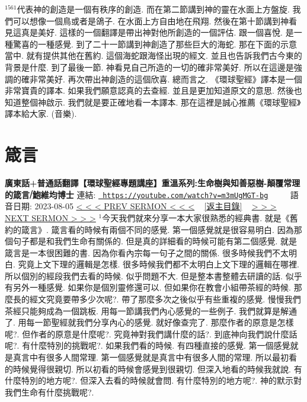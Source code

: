 \documentclass{book}
\begin{document}
$^{1561}$代表神的創造是一個有秩序的創造.
而在第二節講到神的靈在水面上方盤旋.
我們可以想像一個鳥或者是鴿子.
在水面上方自由地在飛翔.
然後在第十節講到神看見這真是美好.
這樣的一個翻譯是帶出神對他所創造的一個評估.
跟一個喜悅.
是一種驚喜的一種感覺.
到了二十一節講到神創造了那些巨大的海蛇.
那在下面的示意當中.
就有提供其他在舊約.
這個海蛇跟海怪出現的經文.
並且也告訴我們古今東的背景是什麼.
到了最後一節.
神看見自己所造的一切的確非常美好.
所以在這邊是強調的確非常美好.
再次帶出神創造的這個欣喜.
總而言之.
《環球聖經》譯本是一個非常寶貴的譯本.
如果我們願意認真的去查經.
並且是更加知道原文的意思.
然後也知道整個神啟示.
我們就是要正確地看一本譯本.
那在這裡是誠心推薦《環球聖經》譯本給大家.
(音樂).
\newpage



\section{箴言}
\label{sec:m3mUgMGT_bg}
\textbf{廣東話+普通話翻譯【環球聖經專題講座】重溫系列:生命樹與知善惡樹-顛覆常理的箴言⧸鮑維均博士}
\newline
\newline
連結: \href{https://youtube.com/watch?v=m3mUgMGT-bg}{\texttt{ https://youtube.com/watch?v=m3mUgMGT-bg}} ~~~~ 語音日期: 2023-08-05 
\newline
\newline
\hyperref[sec:0YlBYq577gM]{\small{< < < PREV SERMON < < <}}
~
\hyperref[sec:index]{\small{[返主目錄]}}
~
\hyperref[sec:YWND_9pGVGE]{\small{> > > NEXT SERMON > > >}}
\newline
\newline
$^{1}$今天我們就來分享一本大家很熟悉的經典書.
就是《舊約的箴言》.
箴言看的時候有兩個不同的感覺.
第一個感覺就是很容易明白.
因為那個句子都是和我們生命有關係的.
但是真的詳細看的時候可能有第二個感覺.
就是箴言是一本很困難的書.
因為你看內宗每一句子之間的關係.
很多時候我們不太明白.
究竟上文下理的邏輯是怎樣.
很多時候我們都不太明白上文下理的邏輯在哪裡.
所以個別的經段我們去看的時候.
似乎問題不大.
但是整本書整體去研讀的話.
似乎有另外一種感覺.
如果你是個別靈修還可以.
但如果你在教會小組帶茶經的時候.
那麼長的經文究竟要帶多少次呢?.
帶了那麼多次之後似乎有些重複的感覺.
慢慢我們茶經只能夠成為一個跳板.
用每一節講我們內心感覺的一些例子.
我們就算是解通了.
用每一節聖經就我們分享內心的感覺.
就好像查完了.
那麼作者的原意是怎樣呢?.
但作者的原意是什麼呢?.
究竟神對我們講什麼的話?.
到底神向我們說什麼話呢?.
有什麼特別的挑戰呢?.
如果我們看的時候.
有四種直接的感覺.
第一個感覺就是真言中有很多人間常理.
第一個感覺就是真言中有很多人間的常理.
所以最初看的時候覺得很親切.
所以初看的時候會感覺到很親切.
但深入地看的時候我就說.
有什麼特別的地方呢?.
但深入去看的時候就會問.
有什麼特別的地方呢?.
神的默示對我們生命有什麼挑戰呢?.
\end{document}
